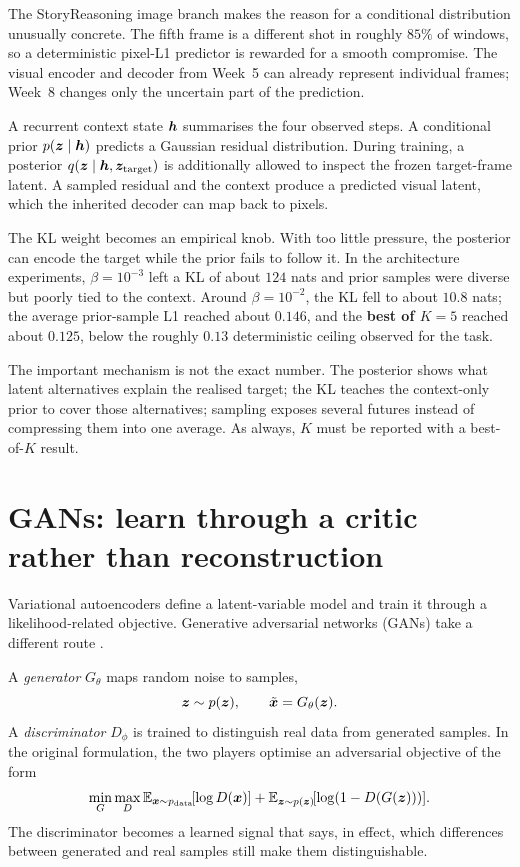 \begin{architecturebox}
The StoryReasoning image branch makes the reason for a conditional distribution unusually concrete. The fifth frame is a different shot in roughly \(85\%\) of windows, so a deterministic pixel-L1 predictor is rewarded for a smooth compromise. The visual encoder and decoder from Week~5 can already represent individual frames; Week~8 changes only the uncertain part of the prediction.

A recurrent context state \(\bm{h}\) summarises the four observed steps. A conditional prior \(p(\bm{z}\mid\bm{h})\) predicts a Gaussian residual distribution. During training, a posterior \(q(\bm{z}\mid\bm{h},\bm{z}_{\mathrm{target}})\) is additionally allowed to inspect the frozen target-frame latent. A sampled residual and the context produce a predicted visual latent, which the inherited decoder can map back to pixels.

The KL weight becomes an empirical knob. With too little pressure, the posterior can encode the target while the prior fails to follow it. In the architecture experiments, \(\beta=10^{-3}\) left a KL of about \(124\) nats and prior samples were diverse but poorly tied to the context. Around \(\beta=10^{-2}\), the KL fell to about \(10.8\) nats; the average prior-sample L1 reached about \(0.146\), and the \textbf{best of \(K=5\)} reached about \(0.125\), below the roughly \(0.13\) deterministic ceiling observed for the task.

The important mechanism is not the exact number. The posterior shows what latent alternatives explain the realised target; the KL teaches the context-only prior to cover those alternatives; sampling exposes several futures instead of compressing them into one average. As always, \(K\) must be reported with a best-of-\(K\) result.
\end{architecturebox}

\section{GANs: learn through a critic rather than reconstruction}

Variational autoencoders define a latent-variable model and train it through a likelihood-related objective. Generative adversarial networks (GANs) take a different route \parencite{goodfellow2014}.

A \emph{generator} \(G_\theta\) maps random noise to samples,
\[
  \bm{z}\sim p(\bm{z}),
  \qquad
  \tilde{\bm{x}}=G_\theta(\bm{z}).
\]
A \emph{discriminator} \(D_\phi\) is trained to distinguish real data from generated samples. In the original formulation, the two players optimise an adversarial objective of the form
\begin{equation}
  \min_G\max_D
  \mathbb{E}_{\bm{x}\sim p_{\mathrm{data}}}\![\log D(\bm{x})]
  +
  \mathbb{E}_{\bm{z}\sim p(\bm{z})}\![\log(1-D(G(\bm{z})))] .
  \label{eq:week8-gan}
\end{equation}
The discriminator becomes a learned signal that says, in effect, which differences between generated and real samples still make them distinguishable.

